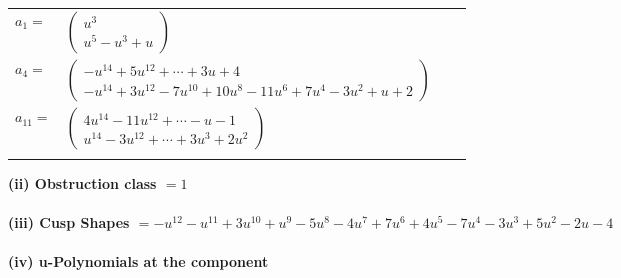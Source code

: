 \documentclass[1p]{elsarticle_modified}
\theoremstyle{definition}
\begin{document}
\begin{tabular}{m{7pt} m{180pt} m{7pt} m{180pt} }
\flushright $a_{1}=$&$\begin{pmatrix}u^3\\u^5- u^3+u\end{pmatrix}$ \\
\flushright $a_{4}=$&$\begin{pmatrix}- u^{14}+5 u^{12}+\cdots+3 u+4\\- u^{14}+3 u^{12}-7 u^{10}+10 u^8-11 u^6+7 u^4-3 u^2+u+2\end{pmatrix}$ \\
\flushright $a_{11}=$&$\begin{pmatrix}4 u^{14}-11 u^{12}+\cdots- u-1\\u^{14}-3 u^{12}+\cdots+3 u^3+2 u^2\end{pmatrix}$\\&\end{tabular}
\flushleft \textbf{(ii) Obstruction class $= 1$}\\~\\
\flushleft \textbf{(iii) Cusp Shapes $= - u^{12}- u^{11}+3 u^{10}+u^9-5 u^8-4 u^7+7 u^6+4 u^5-7 u^4-3 u^3+5 u^2-2 u-4$}\\~\\
\newpage\renewcommand{\arraystretch}{1}
\flushleft \textbf{(iv) u-Polynomials at the component}\newline \\
\end{document}
